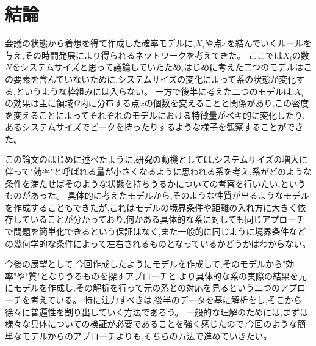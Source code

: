 \chapter{結論}

会議の状態から着想を得て作成した確率モデルに,$X_{i}$や点$x$を結んでいくルールを与え,その時間発展により得られるネットワークを考えてきた。
ここでは$X_{i}$の数$N$をシステムサイズと思って議論していたため,はじめに考えた二つのモデルはこの要素を含んでいないために,システムサイズの変化によって系の状態が変化する,というような枠組みには入らない。
一方で後半に考えた二つのモデルは,$X_{i}$の効果は主に領域$\Omega$内に分布する点$x$の個数を変えることと関係があり,この密度を変えることによってそれぞれのモデルにおける特徴量がベキ的に変化したり,あるシステムサイズでピークを持ったりするような様子を観察することができた。

この論文のはじめに述べたように,研究の動機としては,システムサイズの増大に伴って"効率"と呼ばれる量が小さくなるように思われる系を考え,系がどのような条件を満たせばそのような状態を持ちうるかについての考察を行いたい,というものがあった。
具体的に考えたモデルから,そのような性質が出るようなモデルを作成することもできたが,これはモデルの境界条件や距離の入れ方に大きく依存していることが分かっており,何かある具体的な系に対しても同じアプローチで問題を簡単化できるという保証はなく,また一般的に同じように境界条件などの幾何学的な条件によって左右されるものとなっているかどうかはわからない。

今後の展望として,今回作成したようにモデルを作成して,そのモデルから"効率"や"質"となりうるものを探すアプローチと,より具体的な系の実際の結果を元にモデルを作成し,その解析を行って元の系との対応を見るという二つのアプローチを考えている。
特に注力すべきは,後半のデータを基に解析をし,そこから徐々に普遍性を割り出していく方法であろう。
一般的な理解のためには,まずは様々な具体についての検証が必要であることを強く感じたので,今回のような簡単なモデルからのアプローチよりも,そちらの方法で進めていきたい。
